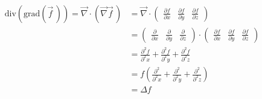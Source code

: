   \begin{align*}
  \text{div}(\text{grad}(\vec f\,)) = \vec\nabla \cdot \left(\vec\nabla \vec f\,\right)
    & =
      \vec\nabla \cdot
      \begin{pmatrix}
        \frac{\partial f}{\partial x} &
        \frac{\partial f}{\partial y} &
        \frac{\partial f}{\partial z}
      \end{pmatrix} \\
    & =
      \begin{pmatrix}
        \frac{\partial}{\partial x} &
        \frac{\partial}{\partial y} &
        \frac{\partial}{\partial z}
      \end{pmatrix}
      \cdot
      \begin{pmatrix}
        \frac{\partial f}{\partial x} &
        \frac{\partial f}{\partial y} &
        \frac{\partial f}{\partial z}
      \end{pmatrix} \\
    & =
      \frac{\partial^2 f}{\partial^2 x} +
      \frac{\partial^2 f}{\partial^2 y} +
      \frac{\partial^2 f}{\partial^2 z} \\
    & = f
      \left(
      \frac{\partial^2}{\partial^2 x} +
      \frac{\partial^2}{\partial^2 y} +
      \frac{\partial^2}{\partial^2 z}
      \right) \\
    & = \Delta f
  \end{align*}
